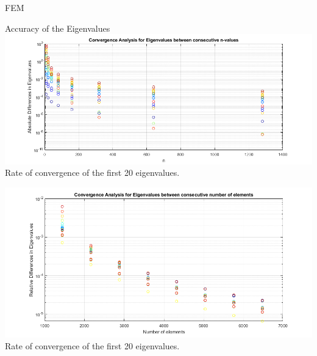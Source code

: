 \documentclass[8pt]{beamer}
\begin{document}
        \begin{frame}{FEM}
        \end{frame}

        \begin{frame}{Accuracy of the Eigenvalues}
            \centering
            \includegraphics[scale=0.3]{Convergence.png} \\ %
            \footnotesize Rate of convergence of the first 20 eigenvalues.

            \centering
            \includegraphics[scale=0.3]{convergence3d.png} \\ %
            \footnotesize Rate of convergence of the first 20 eigenvalues.
        \end{frame}
\end{document}
